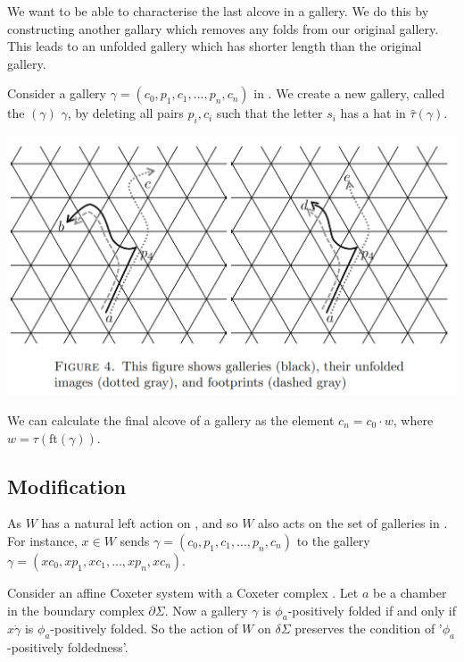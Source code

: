 \documentclass[11pt]{article}
\begin{document}
We want to be able to characterise the last alcove in a gallery. We do this by constructing another gallary which removes any folds from our original gallery. This leads to an unfolded gallery which has shorter length than the original gallery.

\begin{definition}
    Consider a gallery $\gamma = (c_0,p_1,c_1,...,p_n,c_n)$ in \sg. We create a new gallery, called the  $(\gamma)$  $\gamma$, by deleting all pairs $p_i,c_i$ such that the letter $s_i$ has a hat in $\hat{\tau}(\gamma)$. 

\end{definition}

\includegraphics[scale=0.6]{Screenshot 2023-02-03 133522.png}\\

\begin{lemma}
    We can calculate the final alcove of a gallery as the element $c_n=c_0\cdot w$, where $w=\tau(\text{ft}(\gamma))$.
\end{lemma}

\subsection{Modification}

As $W$ has a natural left action on \sg, and so $W$ also acts on the set of galleries in \sg. For instance, $x\in W$ sends $\gamma = (c_0,p_1,c_1,...,p_n,c_n)$ to the gallery $\gamma = (xc_0,xp_1,xc_1,...,xp_n,xc_n)$. 

\begin{lemma}
    Consider an affine Coxeter system \W with a Coxeter complex \sg. Let $a$ be a chamber in the boundary complex $\partial\Sigma$. Now a gallery $\gamma$ is $\phi_a$-positively folded if and only if $x\dot \gamma$ is $\phi_a$-positively folded. So the action of $W$ on $\delta\Sigma$ preserves the condition of '$\phi_a$-positively foldedness'.
\end{lemma}
\end{document}

